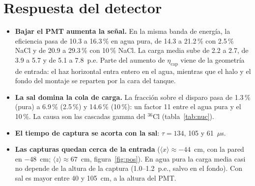 \documentclass[11pt,a4paper]{article}
\newcommand{\tabla}[1]{}
\begin{document}
\section{Respuesta del detector}
\begin{table}[H]\centering\footnotesize\setlength\tabcolsep{4pt}
\tabla{respuesta_detector}
\caption{Respuesta por neutrón incidente. $\varepsilon$: fracción con $Q\geq1$~p.e.;
$\varepsilon_\text{disp}$: fracción que pasa el disparo del prototipo (pico $>1200$~ADC) con la electrónica
simulada y el factor común $k=650$~ADC/p.e.; $\eta_\text{cap}$: fracción con al menos una captura en el agua;
$\langle Q\rangle$: carga media de los eventos con $Q\geq1$; $t_{1/2}$: mediana del tiempo de la primera captura;
$\tau$: pendiente de la cola exponencial entre 50 y 600~$\mu$s. ``Tapa'': las corridas del montaje con el PMT en
la tapa, restringidas a los neutrones de la misma banda (10~meV--10~eV; halo y fondo, 298\,734 eventos).}\label{tab:resp}
\end{table}

\begin{itemize}
\item \textbf{Bajar el PMT aumenta la señal.} En la misma banda de energía, la eficiencia pasa de 10.3 a 16.3\,\%
en agua pura, de 14.3 a 21.2\,\% con 2.5\,\% NaCl y de 20.9 a 29.3\,\% con 10\,\% NaCl. La carga media sube
de 2.2 a 2.7, de 3.9 a 5.7 y de 5.1 a 7.8~p.e. Parte del aumento de $\eta_\text{cap}$ viene de la geometría de
entrada: el haz horizontal entra entero en el agua, mientras que el halo y el fondo del montaje se reparten
por la cara del tanque.
\item \textbf{La sal domina la cola de carga.} La fracción sobre el disparo pasa de 1.3\,\% (pura) a 6.9\,\%
(2.5\,\%) y 14.6\,\% (10\,\%): un factor 11 entre el agua pura y el 10\,\%. La causa son las cascadas gamma del
$^{36}$Cl (tabla~\ref{tab:nuc}).
\item \textbf{El tiempo de captura se acorta con la sal}: $\tau = 134$, 105 y 61~$\mu$s.
\item \textbf{Las capturas quedan cerca de la entrada} ($\langle x\rangle\approx-44$~cm, con la pared en $-48$~cm;
$\langle z\rangle\approx67$~cm, figura~\ref{fig:pos}). En agua pura la carga media casi no depende de la altura de
la captura (1.0--1.2~p.e., salvo en el fondo). Con sal es mayor entre 40 y 105~cm, a la altura del PMT.
\end{itemize}

\begin{table}[H]\centering\small
\tabla{nucleos}
\caption{Núcleo de la primera captura en el medio [\%].}\label{tab:nuc}
\end{table}
\end{document}
